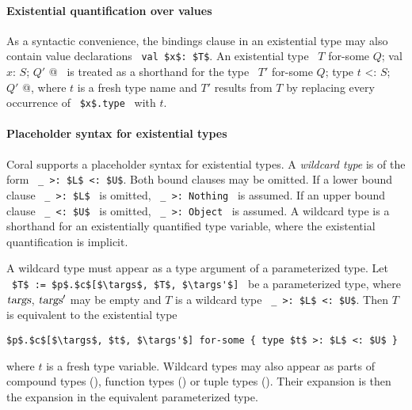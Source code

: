 \paragraph{Existential quantification over values}
As a syntactic convenience, the bindings clause in an existential type may also contain value declarations ~\lstinline!val $x$: $T$!. An existential type ~\lstinline@$T$ for-some { $Q$; val $x$: $S$; $Q'$ }@~ is treated as a shorthand for the type ~\lstinline@$T'$ for-some { $Q$; type $t$ <: $S$; $Q'$ }@, where $t$ is a fresh type name and $T'$ results from $T$ by replacing every occurrence of ~\lstinline!$x$.type!~ with $t$. 



\paragraph{Placeholder syntax for existential types}
Coral supports a placeholder syntax for existential types. A {\em wildcard type} is of the form ~\lstinline!_ >: $L$ <: $U$!. Both bound clauses may be omitted. If a lower bound clause ~\lstinline!_ >: $L$!~ is omitted, ~\lstinline!_ >: Nothing!~ is assumed. If an upper bound clause ~\lstinline!_ <: $U$!~ is omitted, ~\lstinline!_ >: Object!~ is assumed. A wildcard type is a shorthand for an existentially quantified type variable, where the existential quantification is implicit. 

A wildcard type must appear as a type argument of a parameterized type. Let ~\lstinline!$T$ := $p$.$c$[$\targs$, $T$, $\targs'$]!~ be a parameterized type, where $\mbox{\sl targs}$, $\mbox{\sl targs}'$ may be empty and $T$ is a wildcard type ~\lstinline!_ >: $L$ <: $U$!. Then $T$ is equivalent to the existential type
\begin{lstlisting}
$p$.$c$[$\targs$, $t$, $\targs'$] for-some { type $t$ >: $L$ <: $U$ }
\end{lstlisting}
where $t$ is a fresh type variable. Wildcard types may also appear as parts of compound types (), function types () or tuple types (). Their expansion is then the expansion in the equivalent parameterized type. 

